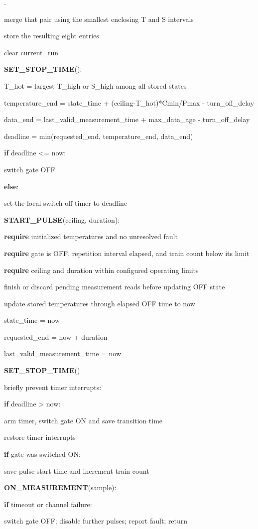 \documentclass[11pt,letterpaper]{article}
\newcounter{pseudoline}
\newenvironment{pseudocode}{%
  \par\begingroup\small
  \setcounter{pseudoline}{0}
  \begin{list}{\arabic{pseudoline}.}{%
    \usecounter{pseudoline}
    \setlength{\leftmargin}{2.5em}
    \setlength{\labelwidth}{1.9em}
    \setlength{\labelsep}{0.6em}
    \setlength{\itemsep}{0.15em}
    \setlength{\parsep}{0pt}
    \setlength{\topsep}{0.35em}}%
  }{\end{list}\endgroup\par}
\newcommand{\pcstep}[2]{%
  \item \hspace*{#1em}%
  \parbox[t]{\dimexpr\linewidth-#1em\relax}{\raggedright #2\strut}}
\begin{document}
\begin{pseudocode}
\pcstep{2.0}{merge that pair using the smallest enclosing T and S intervals}
\pcstep{2.0}{store the resulting eight entries}
\pcstep{1.0}{clear current\_\allowbreak{}run}
\par\vspace{0.35em}
\pcstep{0.0}{\textbf{SET\_\allowbreak{}STOP\_\allowbreak{}TIME}():}
\pcstep{1.0}{T\_\allowbreak{}hot = largest T\_\allowbreak{}high or S\_\allowbreak{}high among all stored states}
\pcstep{1.0}{temperature\_\allowbreak{}end = state\_\allowbreak{}time + (ceiling-T\_\allowbreak{}hot)*Cmin/Pmax - turn\_\allowbreak{}off\_\allowbreak{}delay}
\pcstep{1.0}{data\_\allowbreak{}end = last\_\allowbreak{}valid\_\allowbreak{}measurement\_\allowbreak{}time + max\_\allowbreak{}data\_\allowbreak{}age - turn\_\allowbreak{}off\_\allowbreak{}delay}
\pcstep{1.0}{deadline = min(requested\_\allowbreak{}end, temperature\_\allowbreak{}end, data\_\allowbreak{}end)}
\pcstep{1.0}{\textbf{if} deadline <= now:}
\pcstep{2.0}{switch gate OFF}
\pcstep{1.0}{\textbf{else}:}
\pcstep{2.0}{set the local switch-off timer to deadline}
\par\vspace{0.35em}
\pcstep{0.0}{\textbf{START\_\allowbreak{}PULSE}(ceiling, duration):}
\pcstep{1.0}{\textbf{require} initialized temperatures and no unresolved fault}
\pcstep{1.0}{\textbf{require} gate is OFF, repetition interval elapsed, and train count below its limit}
\pcstep{1.0}{\textbf{require} ceiling and duration within configured operating limits}
\pcstep{1.0}{finish or discard pending measurement reads before updating OFF state}
\pcstep{1.0}{update stored temperatures through elapsed OFF time to now}
\pcstep{1.0}{state\_\allowbreak{}time = now}
\pcstep{1.0}{requested\_\allowbreak{}end = now + duration}
\pcstep{1.0}{last\_\allowbreak{}valid\_\allowbreak{}measurement\_\allowbreak{}time = now}
\pcstep{1.0}{\textbf{SET\_\allowbreak{}STOP\_\allowbreak{}TIME}()}
\pcstep{1.0}{briefly prevent timer interrupts:}
\pcstep{2.0}{\textbf{if} deadline > now:}
\pcstep{3.0}{arm timer, switch gate ON and save transition time}
\pcstep{1.0}{restore timer interrupts}
\pcstep{1.0}{\textbf{if} gate was switched ON:}
\pcstep{2.0}{save pulse-start time and increment train count}
\par\vspace{0.35em}
\pcstep{0.0}{\textbf{ON\_\allowbreak{}MEASUREMENT}(sample):}
\pcstep{1.0}{\textbf{if} timeout or channel failure:}
\pcstep{2.0}{switch gate OFF; disable further pulses; report fault; return}

\end{pseudocode}
\end{document}
